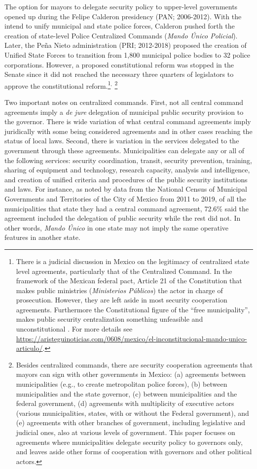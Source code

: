 \documentclass[12pt]{amsart}
\numberwithin{equation}{section}
\theoremstyle{definition}
\theoremstyle{definition}
\theoremstyle{definition}
\begin{document}
The option for mayors to delegate security policy to upper-level governments opened up during the Felipe Calderon presidency (PAN; 2006-2012). With the intend to unify municipal and state police forces, Calderon pushed forth the creation of state-level Police Centralized   Commands (\emph{Mando \'Unico Policial}). Later, the Peña Nieto administration (PRI; 2012-2018) proposed the creation of Unified State Forces to transition from 1,800 municipal police bodies to 32 police corporations. However, a proposed constitutional reform was stopped in the Senate since it did not reached the necessary three quarters of legislators to approve the constitutional reform.\footnote{There is a judicial discussion in Mexico on the legitimacy of centralized state level agreements, particularly that of the Centralized Command. In the framework of the Mexican federal pact, Article 21 of the Constitution that makes public ministries (\emph{Ministerios P\'ublicos}) the actor in charge of prosecution. However, they are  left aside in most security cooperation agreements. Furthermore the Constitutional figure of the ``free municipality'', makes public security centralization something unfeasible and unconstitutional \citep{moloeznik_2016}. For more details see \url{https://aristeguinoticias.com/0608/mexico/el-inconstitucional-mando-unico-articulo/}.}$^,$ \footnote{Besides centralized commands, there are security cooperation agreements that mayors can sign with other governments in Mexico: (a) agreements between municipalities (e.g., to create metropolitan police forces), (b) between municipalities and the state governor, (c) between municipalities and the federal government, (d) agreements with multiplicity of executive actors (various municipalities, states, with or without the Federal government), and (e) agreements with other branches of government, including legislative and judicial ones, also at various levels of government. This paper focuses on agreements where municipalities delegate security policy to governors only, and leaves aside other forms of cooperation with governors and other political actors.}  

Two important notes on centralized commands. First, not all central command agreements imply a \emph{de jure} delegation of municipal public security provision to the governor. There is wide variation of what central command agreements imply juridically with some being considered agreements and in other cases reaching the status of local laws. Second, there is variation in the services delegated to the government through these agreements. Municipalities can delegate any or all of the following services: security coordination, transit, security prevention, training, sharing of equipment and technology, research capacity, analysis and intelligence, and creation of unified criteria and procedures of the public security institutions and laws. For instance, as noted by data from the National Census of Municipal Governments and Territories of the City of Mexico from 2011 to 2019, of all the municipalities that state they had a central command agreement, 72.6\% said the agreement included the delegation of public security while the rest did not. In other words, \emph{Mando \'Unico} in one state may not imply the same operative features in another state. 
\end{document}
